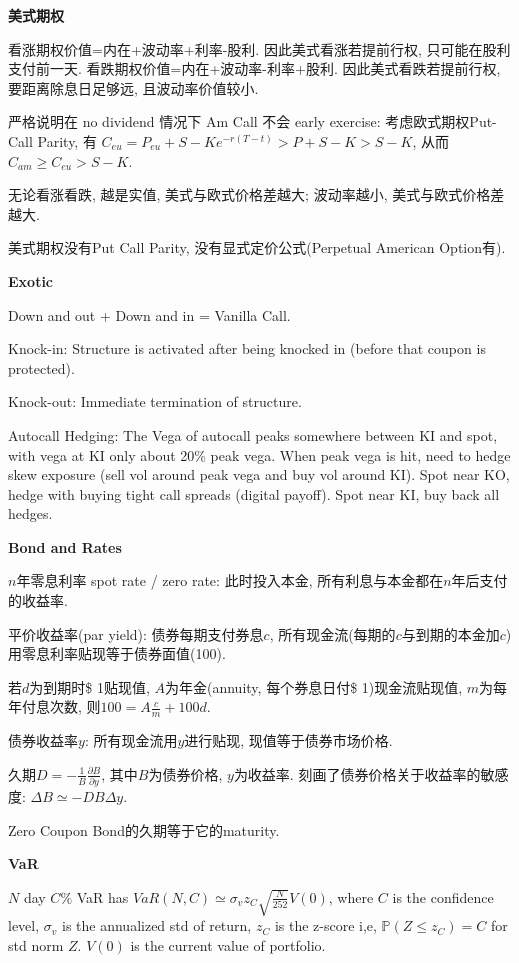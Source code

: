\documentclass[UTF8]{ctexart}
\begin{document}
\noindent \textbf{美式期权} \par
看涨期权价值=内在+波动率+利率-股利. 因此美式看涨若提前行权, 只可能在股利支付前一天.
看跌期权价值=内在+波动率-利率+股利. 因此美式看跌若提前行权, 要距离除息日足够远, 且波动率价值较小.

严格说明在 no dividend 情况下 Am Call 不会 early exercise:
考虑欧式期权Put-Call Parity, 有 $C_{eu} = P_{eu} + S - Ke^{-r(T-t)} > P + S - K > S - K$,
从而 $C_{am} \geq C_{eu}>S-K$.

无论看涨看跌, 越是实值, 美式与欧式价格差越大; 波动率越小, 美式与欧式价格差越大.

美式期权没有Put Call Parity, 没有显式定价公式(Perpetual American Option有).


\noindent \textbf{Exotic} \par
Down and out + Down and in = Vanilla Call.

Knock-in: Structure is activated after being knocked in (before that coupon is protected).

Knock-out: Immediate termination of structure.

Autocall Hedging: 
The Vega of autocall peaks somewhere between KI and spot, with vega at KI only about 20\% peak vega.
When peak vega is hit, need to hedge skew exposure (sell vol around peak vega and buy vol around KI).
Spot near KO, hedge with buying tight call spreads (digital payoff).
Spot near KI, buy back all hedges.


\noindent \textbf{Bond and Rates} \par

$n$年零息利率 spot rate / zero rate: 此时投入本金, 所有利息与本金都在$n$年后支付的收益率.

平价收益率(par yield): 债券每期支付券息$c$, 所有现金流(每期的$c$与到期的本金加$c$)用零息利率贴现等于债券面值(100).

若$d$为到期时\$ 1贴现值, $A$为年金(annuity, 每个券息日付\$ 1)现金流贴现值, $m$为每年付息次数, 则$100=A\frac{c}{m}+100d$.

债券收益率$y$: 所有现金流用$y$进行贴现, 现值等于债券市场价格.

久期$D=-\frac{1}{B}\frac{\partial B}{\partial y}$, 其中$B$为债券价格, $y$为收益率. 刻画了债券价格关于收益率的敏感度: $\Delta B\simeq -DB\Delta y$.

Zero Coupon Bond的久期等于它的maturity.


\noindent \textbf{VaR} \par

$N$ day $C\%$ VaR has $VaR(N,C)\simeq \sigma_v z_C \sqrt{\frac{N}{252}}V(0)$,
where $C$ is the confidence level, $\sigma_v$ is the annualized std of return, $z_C$ is the z-score i,e, $\mathbb{P}(Z\leq z_C)=C$ for std norm $Z$.
$V(0)$ is the current value of portfolio.
\end{document}
